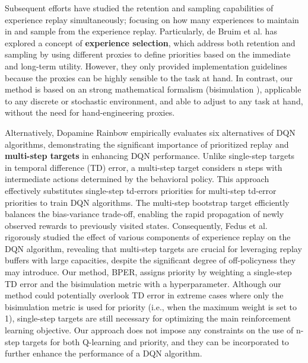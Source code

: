 Subsequent efforts have studied the retention and sampling capabilities of experience replay simultaneously; focusing on how many experiences to maintain in and sample from the experience replay.  Particularly, de Bruim et al. \cite{de2018experience} has explored a concept of \textbf{experience selection}, which address both retention and sampling by using different proxies to define priorities based on the immediate and long-term utility. However, they only provided implementation guidelines because the proxies can be highly sensible to the task at hand. In contrast, our method is based on an strong mathematical formalism (bisimulation \cite{li2006towards}), applicable to any discrete or stochastic environment, and able to adjust to any task at hand, without the need for hand-engineering proxies.

Alternatively, Dopamine Rainbow \cite{hessel2018rainbow} empirically evaluates six alternatives of DQN algorithms, demonstrating the significant importance of prioritized replay and \textbf{multi-step targets} in enhancing DQN performance. Unlike single-step targets in temporal difference (TD) error, a multi-step target considers n steps with intermediate actions determined by the behavioral policy. This approach effectively substitutes single-step td-errors priorities for multi-step td-error priorities to train DQN algorithms. The multi-step bootstrap target \cite{sutton1988learning, sutton2018reinforcement} efficiently balances the bias-variance trade-off, enabling the rapid propagation of newly observed rewards to previously visited states. Consequently, Fedus et al. \cite{fedus2020revisiting} rigorously studied the effect of various components of experience replay on the DQN algorithm, revealing that multi-step targets are crucial for leveraging replay buffers with large capacities, despite the significant degree of off-policyness they may introduce. Our method, BPER, assigns priority by weighting a single-step TD error and the bisimulation metric with a hyperparameter. Although our method could potentially overlook TD error in extreme cases where only the bisimulation metric is used for priority (i.e., when the maximum weight is set to 1), single-step targets are still necessary for optimizing the main reinforcement learning objective. Our approach does not impose any constraints on the use of n-step targets for both Q-learning and priority, and they can be incorporated to further enhance the performance of a DQN algorithm.

